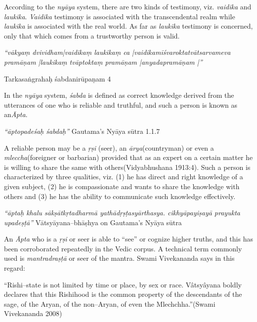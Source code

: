 According to the \textit{nyāya} system, there are two kinds of testimony, viz. \textit{vaidika} and \textit{laukika}. \textit{Vaidika} testimony is associated with the transcendental realm while \textit{laukika} is associated with the real world. As far as \textit{laukika} testimony is concerned, only that which comes from a trustworthy person is valid.

\begin{myquote}
\textit{“vākyaṃ dvividham|vaidikaṃ laukikaṃ ca |vaidikamīśvaroktatvātsarvameva pramāṇam |laukikaṃ tvāptoktaṃ pramāṇam |anyadapramāṇam |”}
\end{myquote}

\begin{center}
Tarkasaṅgrahaḥ śabdanirūpaṇam 4
\end{center}

In the \textit{nyāya} system, \textit{śabda} is defined as correct knowledge derived from the utterances of one who is reliable and truthful, and such a person is known as an\textit{Āpta}.

\begin{myquote}
\textit{“āptopadeśaḥ śabdaḥ”} Gautama’s Nyāya sūtra 1.1.7
\end{myquote}

A reliable person may be a \textit{ṛṣi} (seer), an \textit{ārya}(countryman) or even a \textit{mleccha}(foreigner or barbarian) provided that as an expert on a certain matter he is willing to share the same with others(Vidyabhushana 1913:4). Such a person is characterized by three qualities, viz. (1) he has direct and right knowledge of a given subject, (2) he is compassionate and wants to share the knowledge with others and (3) he has the ability to communicate such knowledge effectively.

\begin{myquote}
\textit{“āptaḥ khalu sākṣātkṛtadharmā yathādṛṣṭasyārthasya. cikhyāpayiṣayā prayukta upadeṣṭā”} Vātsyāyana–bhāṣhya on Gautama’s Nyāya sūtra
\end{myquote}

An \textit{Āpta} who is a \textit{ṛṣi} or seer is able to “see” or cognize higher truths, and this has been corroborated repeatedly in the Vedic corpus. A technical term commonly used is \textit{mantradraṣṭā} or seer of the mantra. Swami Vivekananda says in this regard:

\begin{myquote}
“Rishi–state is not limited by time or place, by sex or race. Vâtsyâyana boldly declares that this Rishihood is the common property of the descendants of the sage, of the Aryan, of the non–Aryan, of even the Mlechchha.”(Swami Vivekananda 2008)
\end{myquote}

